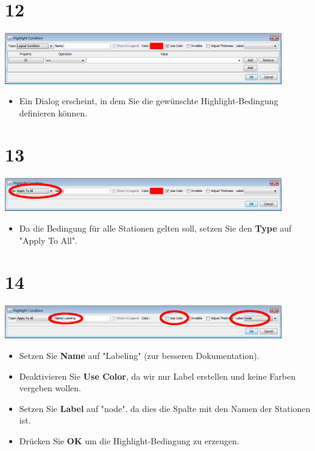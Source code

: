 \documentclass{beamer}
\begin{document}
\section{12}
\begin{frame}
	\begin{center}
  		\includegraphics[width=0.9\textwidth]{12.png}
	\end{center}
	\begin{itemize}
		\item Ein Dialog erscheint, in dem Sie die gewünschte Highlight-Bedingung definieren können.
	\end{itemize}
\end{frame}

\section{13}
\begin{frame}
	\begin{center}
  		\includegraphics[width=0.9\textwidth]{13.png}
	\end{center}
	\begin{itemize}
		\item Da die Bedingung für alle Stationen gelten soll, setzen Sie den \textbf{Type} auf "Apply To All".
	\end{itemize}
\end{frame}

\section{14}
\begin{frame}
	\begin{center}
  		\includegraphics[width=0.9\textwidth]{14.png}
	\end{center}
	\begin{itemize}
		\item Setzen Sie \textbf{Name} auf "Labeling" (zur besseren Dokumentation).
		\item Deaktivieren Sie \textbf{Use Color}, da wir nur Label erstellen und keine Farben vergeben wollen.
		\item Setzen Sie \textbf{Label} auf "node", da dies die Spalte mit den Namen der Stationen ist.
		\item Drücken Sie \textbf{OK} um die Highlight-Bedingung zu erzeugen.
	\end{itemize}
\end{frame}
\end{document}
